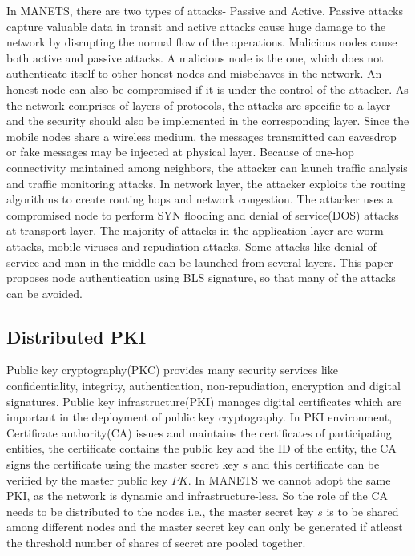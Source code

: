 \documentclass[11pt,a4paper]{llncs}
\begin{document}
In MANETS, there are two types of attacks- Passive and Active. Passive attacks capture valuable data in transit and active attacks cause huge damage to the network by disrupting the normal flow of the operations. Malicious nodes cause both active and passive attacks. A malicious node is the one, which does not authenticate itself to other honest nodes and misbehaves in the network. An honest node can also be compromised if it is under the control of the attacker. As the network comprises of layers of protocols, the attacks are specific to a layer and the security should also be implemented in the corresponding layer. Since the mobile nodes share a wireless medium, the messages transmitted can eavesdrop or fake messages may be injected at physical layer. Because of one-hop connectivity maintained among neighbors, the attacker can launch traffic analysis and traffic monitoring attacks. In network layer, the attacker exploits the routing algorithms to create routing hops and network congestion\cite{perrig2}. The attacker uses a compromised node to perform SYN flooding and denial of service(DOS) attacks at transport layer. The majority of attacks in the application layer are worm attacks, mobile viruses and repudiation attacks. Some attacks like denial of service and man-in-the-middle can be launched from several layers. This paper proposes node authentication using BLS signature, so that many of the attacks can be avoided.

\subsection{Distributed PKI}

Public key cryptography(PKC)\cite{william} provides many security services like confidentiality, integrity, authentication, non-repudiation, encryption and digital signatures. Public key infrastructure(PKI)\cite{kent} manages digital certificates which are important in the deployment of public key cryptography. In PKI environment, Certificate authority(CA) issues and maintains the certificates of participating entities, the certificate contains the public key and the ID of the entity, the CA signs the certificate using the master secret key $s$ and this certificate can be verified by the master public key $PK$. In MANETS we cannot adopt the same PKI, as the network is dynamic and infrastructure-less. So the role of the CA needs to be distributed to the nodes i.e., the master secret key $s$ is to be shared among different nodes and the master secret key can only be generated if atleast the threshold number of shares of secret are pooled together.
\end{document}
